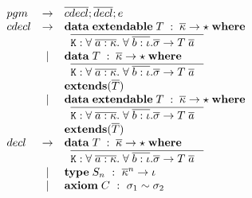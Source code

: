 {\begin{figure}[H]
\begin{minipage}[t]{0.5\linewidth}
\end{minipage}
\begin{minipage}[t]{0.5\linewidth}
\vspace{5mm}
\vspace{2mm}

$
\begin{array}{lcl}
  pgm & \to & \overline{cdecl}; \overline{decl}; e \\
  cdecl & \to & \mathbf{data}\;\mathbf{extendable}\;{T\; : \; \overline{\kappa} \to \star \;\mathbf{where}\;} \\
  & & \;\; \overline{{\tt K} : \forall\; \overline{a:\kappa}.\;
  \forall\;\overline{b : \iota}. \overline{\sigma} \to T\; \overline{a}
       \;\;\;}  \\
  & \;|\; & \mathbf{data}\;{T\; : \; \overline{\kappa} \to \star \;\mathbf{where}\;} \\
  & & \;\; \overline{{\tt K} : \forall\; \overline{a:\kappa}.\;
  \forall\;\overline{b : \iota}. \overline{\sigma} \to T\; \overline{a}
       \;\;\;} \\
  & & \mathbf{extends}(\overline{T})\\
  & \;|\; & \mathbf{data}\;\mathbf{extendable}\;{T\; : \; \overline{\kappa} \to \star \;\mathbf{where}\;} \\
  & & \;\; \overline{{\tt K} : \forall\; \overline{a:\kappa}.\;
  \forall\;\overline{b : \iota}. \overline{\sigma} \to T\; \overline{a}
       \;\;\;} \\
  & & \mathbf{extends}(\overline{T})\\
  decl & \to & \mathbf{data}\;{T\; : \; \overline{\kappa} \to \star \;\mathbf{where}\;} \\
  & & \;\; \overline{{\tt K} : \forall\; \overline{a:\kappa}.\;
  \forall\;\overline{b : \iota}. \overline{\sigma} \to T\; \overline{a}
       \;\;\;}  \\
  & \;|\; & \mathbf{type}\; S_n ~:~ \overline{\kappa}^n \to \iota \\
  & \;|\; & \mathbf{axiom}\; C ~:~ \sigma_1 \sim \sigma_2
\end{array}
$
\end{minipage}


\begin{minipage}[t]{0.45\linewidth}
\vspace{5mm}
\vspace{2mm}


\end{minipage}
\end{figure}}
